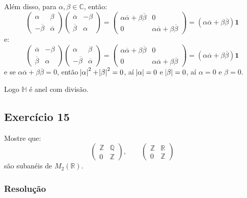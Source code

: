\documentclass[10pt,a4paper]{article}
\begin{document}
\medskip
\noindent
Além disso, para $\alpha,\beta\in\mathbb{C}$, então:
\[
\begin{pmatrix}
\alpha&\beta\\-\overline{\beta}&\overline{\alpha}
\end{pmatrix}
\begin{pmatrix}
\overline{\alpha}&-\beta\\\overline{\beta}&\alpha
\end{pmatrix}=
\begin{pmatrix}
\alpha\overline{\alpha}+\beta\overline{\beta}&0\\0&\alpha\overline{\alpha}+\beta\overline{\beta}
\end{pmatrix}=
(\alpha\overline{\alpha}+\beta\overline{\beta})\textbf{1}
\]
e:
\[
\begin{pmatrix}
\overline{\alpha}&-\beta\\\overline{\beta}&\alpha
\end{pmatrix}
\begin{pmatrix}
\alpha&\beta\\-\overline{\beta}&\overline{\alpha}
\end{pmatrix}=
\begin{pmatrix}
\alpha\overline{\alpha}+\beta\overline{\beta}&0\\0&\alpha\overline{\alpha}+\beta\overline{\beta}
\end{pmatrix}=
(\alpha\overline{\alpha}+\beta\overline{\beta})\textbf{1}
\]
e se $\alpha\overline{\alpha}+\beta\overline{\beta}=0$, então $\abs{\alpha}^2+\abs{\beta}^2=0$, aí $\abs{\alpha}=0$ e $\abs{\beta}=0$, aí $\alpha=0$ e $\beta=0$.

\medskip
\noindent
Logo $\mathbb{H}$ é anel com divisão.

\subsection*{Exercício 15}

Mostre que:
\[
\begin{pmatrix}
\mathbb{Z}&\mathbb{Q}\\0&\mathbb{Z}
\end{pmatrix},\quad\quad\begin{pmatrix}
\mathbb{Z}&\mathbb{R}\\0&\mathbb{Z}
\end{pmatrix}
\]
são subanéis de $M_2(\mathbb{R})$.

\subsubsection*{Resolução}
\end{document}
